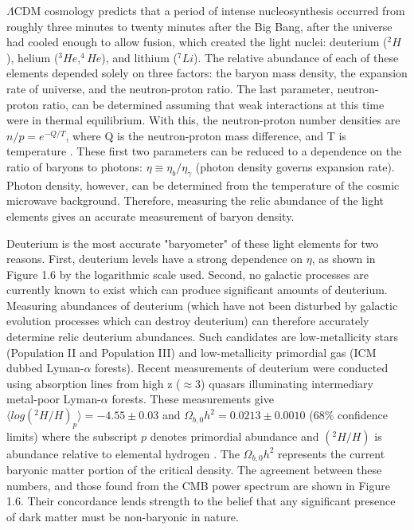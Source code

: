 \documentclass{report}
\begin{document}
$\Lambda$CDM cosmology predicts that a period of intense nucleosynthesis occurred from roughly three minutes to twenty minutes after the Big Bang, after the universe had cooled enough to allow fusion, which created the light nuclei: deuterium ($^2H$), helium ($^3He,^4He$), and lithium ($^7Li$). The relative abundance of each of these elements depended solely on three factors: the baryon mass density, the expansion rate of universe, and the neutron-proton ratio. The last parameter, neutron-proton ratio, can be determined assuming that weak interactions at this time were in thermal equilibrium. With this, the neutron-proton number densities are $n/p = e^{-Q/T}$, where Q is the neutron-proton mass difference, and T is temperature \cite{Amsler2008}. These first two parameters can be reduced to a dependence on the ratio of baryons to photons: $\eta \equiv \eta_{b}/\eta_{\gamma}$ (photon density governs expansion rate). Photon density, however, can be determined from the temperature of the cosmic microwave background. Therefore, measuring the relic abundance of the light elements gives an accurate measurement of baryon density.

Deuterium is the most accurate "baryometer" of these light elements for two reasons. First, deuterium levels have a strong dependence on $\eta$, as shown in Figure 1.6 by the logarithmic scale used. Second, no galactic processes are currently known to exist which can produce significant amounts of deuterium. Measuring abundances of deuterium (which have not been disturbed by galactic evolution processes which can destroy deuterium) can therefore accurately determine relic deuterium abundances. Such candidates are low-metallicity stars (Population II and Population III) and low-metallicity primordial gas (ICM dubbed Lyman-$\alpha$ forests). Recent measurements of deuterium were conducted using absorption lines from high z ($\approx 3$) quasars illuminating intermediary metal-poor Lyman-$\alpha$ forests. These measurements give $\langle log(^2H/H)_{p} \rangle = -4.55 \pm 0.03$ and $\Omega_{b,0}h^2 = 0.0213 \pm 0.0010$ (68\% confidence limits) where the subscript $p$ denotes primordial abundance and $(^2H/H)$ is abundance relative to elemental hydrogen \cite{Pettini2008}. The $\Omega_{b,0}h^2$ represents the current baryonic matter portion of the critical density. The agreement between these numbers, and those found from the CMB power spectrum are shown in Figure 1.6. Their concordance lends strength to the belief that any significant presence of dark matter must be non-baryonic in nature.
\end{document}
